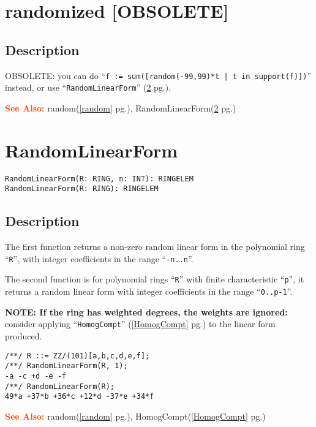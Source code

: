 \documentclass[a4paper]{mybook}
\newenvironment{command}{}{} %
\newcommand\SeeAlso{\par\textcolor{OrangeRed}{\textbf{\large See Also: }}}
\begin{document}
\section{randomized [OBSOLETE]}
\label{randomized [OBSOLETE]}
\begin{command} %



\subsection*{Description}

OBSOLETE:
you can do ``\verb&f := sum([random(-99,99)*t | t in support(f)])&'' instead,
or use ``\verb&RandomLinearForm&'' (\ref{RandomLinearForm} pg.\pageref{RandomLinearForm}).

\SeeAlso %
  random(\ref{random} pg.\pageref{random}), 
    RandomLinearForm(\ref{RandomLinearForm} pg.\pageref{RandomLinearForm})
\end{command} %

\section{RandomLinearForm}
\label{RandomLinearForm}
\begin{command} %


\begin{Verbatim}[label=syntax, rulecolor=\color{MidnightBlue},
frame=single]
RandomLinearForm(R: RING, n: INT): RINGELEM
RandomLinearForm(R: RING): RINGELEM
\end{Verbatim}


\subsection*{Description}

The first function returns a non-zero random linear form in the polynomial
ring ``\verb&R&'', with integer coefficients in the range ``\verb&-n..n&''.
\par 
The second function is for polynomial rings ``\verb&R&'' with finite characteristic
``\verb&p&'', it returns a random linear form with integer coefficients in the
range ``\verb&0..p-1&''.
\par 
\textbf{NOTE: If the ring has weighted degrees, the weights are ignored:}
consider applying ``\verb&HomogCompt&'' (\ref{HomogCompt} pg.\pageref{HomogCompt}) to the linear form produced.
\begin{Verbatim}[label=example, rulecolor=\color{PineGreen}, frame=single]
/**/ R ::= ZZ/(101)[a,b,c,d,e,f];
/**/ RandomLinearForm(R, 1);
-a -c +d -e -f
/**/ RandomLinearForm(R);
49*a +37*b +36*c +12*d -37*e +34*f
\end{Verbatim}


\SeeAlso %
  random(\ref{random} pg.\pageref{random}), 
    HomogCompt(\ref{HomogCompt} pg.\pageref{HomogCompt})
\end{command} %
\end{document}
